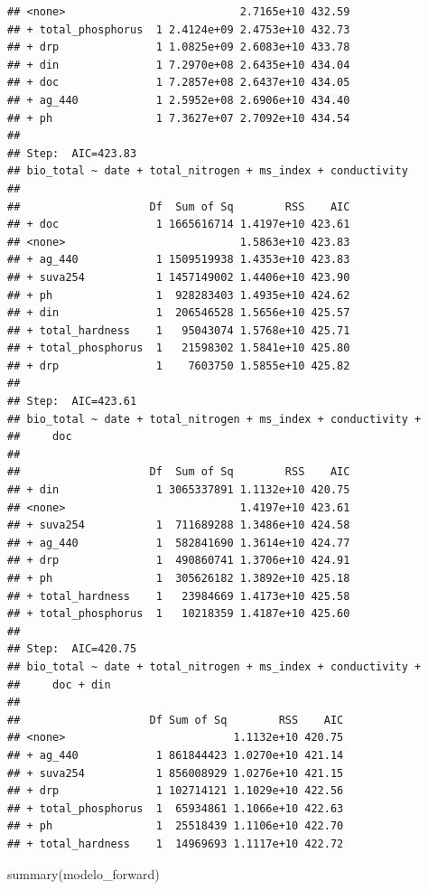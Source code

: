 \documentclass[
]{book}
\newenvironment{Shaded}{\begin{snugshade}}{\end{snugshade}}
\newcommand{\FunctionTok}[1]{\textcolor[rgb]{0.00,0.00,0.00}{#1}}
\newcommand{\NormalTok}[1]{#1}
\begin{document}
\begin{verbatim}
## <none>                           2.7165e+10 432.59
## + total_phosphorus  1 2.4124e+09 2.4753e+10 432.73
## + drp               1 1.0825e+09 2.6083e+10 433.78
## + din               1 7.2970e+08 2.6435e+10 434.04
## + doc               1 7.2857e+08 2.6437e+10 434.05
## + ag_440            1 2.5952e+08 2.6906e+10 434.40
## + ph                1 7.3627e+07 2.7092e+10 434.54
## 
## Step:  AIC=423.83
## bio_total ~ date + total_nitrogen + ms_index + conductivity
## 
##                    Df  Sum of Sq        RSS    AIC
## + doc               1 1665616714 1.4197e+10 423.61
## <none>                           1.5863e+10 423.83
## + ag_440            1 1509519938 1.4353e+10 423.83
## + suva254           1 1457149002 1.4406e+10 423.90
## + ph                1  928283403 1.4935e+10 424.62
## + din               1  206546528 1.5656e+10 425.57
## + total_hardness    1   95043074 1.5768e+10 425.71
## + total_phosphorus  1   21598302 1.5841e+10 425.80
## + drp               1    7603750 1.5855e+10 425.82
## 
## Step:  AIC=423.61
## bio_total ~ date + total_nitrogen + ms_index + conductivity + 
##     doc
## 
##                    Df  Sum of Sq        RSS    AIC
## + din               1 3065337891 1.1132e+10 420.75
## <none>                           1.4197e+10 423.61
## + suva254           1  711689288 1.3486e+10 424.58
## + ag_440            1  582841690 1.3614e+10 424.77
## + drp               1  490860741 1.3706e+10 424.91
## + ph                1  305626182 1.3892e+10 425.18
## + total_hardness    1   23984669 1.4173e+10 425.58
## + total_phosphorus  1   10218359 1.4187e+10 425.60
## 
## Step:  AIC=420.75
## bio_total ~ date + total_nitrogen + ms_index + conductivity + 
##     doc + din
## 
##                    Df Sum of Sq        RSS    AIC
## <none>                          1.1132e+10 420.75
## + ag_440            1 861844423 1.0270e+10 421.14
## + suva254           1 856008929 1.0276e+10 421.15
## + drp               1 102714121 1.1029e+10 422.56
## + total_phosphorus  1  65934861 1.1066e+10 422.63
## + ph                1  25518439 1.1106e+10 422.70
## + total_hardness    1  14969693 1.1117e+10 422.72
\end{verbatim}

\begin{Shaded}
\begin{Highlighting}[]
\FunctionTok{summary}\NormalTok{(modelo\_forward)}
\end{Highlighting}
\end{Shaded}
\end{document}
